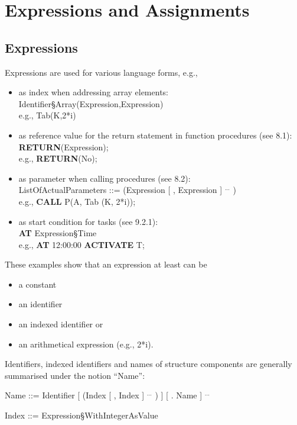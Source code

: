 \chapter{Expressions and Assignments}   %

\section{Expressions}   %

Expressions are used for various language forms, e.g.,

\begin{itemize}
\item as index when addressing array elements:\\
      Identifier\S Array(Expression,Expression)\\
      e.g., Tab(K,2*i)
\item as reference value for the return statement in function procedures
      (see 8.1):\\
      {\bf RETURN}(Expression);\\
      e.g., {\bf RETURN}(No);
\item as parameter when calling procedures (see 8.2):\\
      ListOfActualParameters ::= (Expression [ , Expression ] $^{...}$ )\\
      e.g., {\bf CALL} P(A, Tab (K, 2*i));
\item as start condition for tasks (see 9.2.1):\\
      {\bf AT} Expression\S Time\\
      e.g., {\bf AT} 12:00:00 {\bf ACTIVATE} T;
\end{itemize}

These examples show that an expression at least can be

\begin{itemize}
\item a constant
\item an identifier
\item an indexed identifier or
\item an arithmetical expression (e.g., 2*i).
\end{itemize}

Identifiers, indexed identifiers and names of structure components are
generally summarised under the notion ``Name'':

Name ::= Identifier [ (Index [ , Index ] $^{...}$ ) ] [ . Name ] $^{...}$

Index ::= Expression\S WithIntegerAsValue

